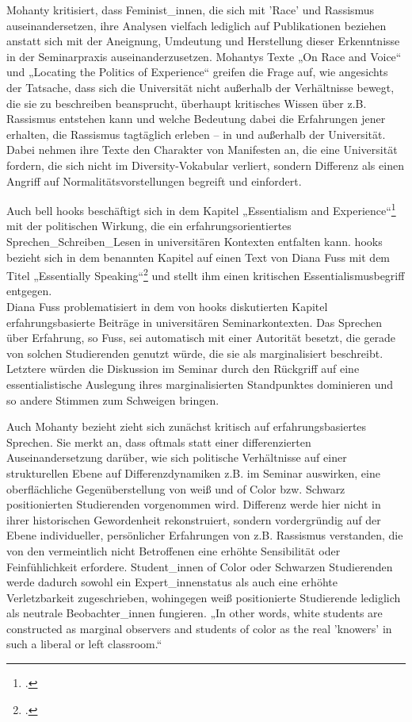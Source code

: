 Mohanty kritisiert, dass Feminist\_innen, die sich mit 'Race' und Rassismus
auseinandersetzen, ihre Analysen vielfach lediglich auf Publikationen beziehen
anstatt sich mit der Aneignung, Umdeutung und Herstellung dieser Erkenntnisse
in der Seminarpraxis auseinanderzusetzen. Mohantys Texte „On Race and
Voice“\footnotemark {} und
„Locating the Politics of Experience“\footnotemark{} greifen
die Frage auf, wie angesichts der Tatsache, dass sich die Universität nicht
außerhalb der Verhältnisse bewegt, die sie zu beschreiben beansprucht,
überhaupt kritisches Wissen über z.B. Rassismus entstehen kann und welche
Bedeutung dabei die Erfahrungen jener erhalten, die Rassismus tagtäglich
erleben – in und außerhalb der Universität. Dabei nehmen ihre Texte den
Charakter von Manifesten an, die eine Universität fordern, die sich nicht im
Diversity-Vokabular verliert, sondern Differenz als einen Angriff auf
Normalitätsvorstellungen begreift und einfordert.

Auch bell hooks beschäftigt sich in dem Kapitel „Essentialism and
Experience“\footnotemark\footcitetext{bellhooks}
mit der politischen Wirkung, die ein erfahrungsorientiertes
Sprechen\_Schreiben\_Lesen in universitären Kontexten entfalten kann. hooks
bezieht sich in dem benannten Kapitel auf einen Text von Diana Fuss mit dem
Titel „Essentially Speaking“\footnotemark\footcitetext[77]{bellhooks} und stellt ihm einen kritischen
Essentialismusbegriff entgegen.
\\

Diana Fuss problematisiert in dem von hooks diskutierten Kapitel
erfahrungsbasierte Beiträge in universitären Seminarkontexten. Das Sprechen
über Erfahrung, so Fuss, sei automatisch mit einer Autorität besetzt, die
gerade von solchen Studierenden genutzt würde, die sie als marginalisiert
beschreibt. Letztere würden die Diskussion im Seminar durch den Rückgriff auf
eine essentialistische Auslegung ihres marginalisierten Standpunktes dominieren
und so andere Stimmen zum Schweigen bringen.\footnotemark{}

Auch Mohanty bezieht zieht sich zunächst kritisch auf erfahrungsbasiertes
Sprechen. Sie merkt an, dass oftmals statt einer differenzierten
Auseinandersetzung darüber, wie sich politische Verhältnisse auf einer
strukturellen Ebene auf Differenzdynamiken z.B. im Seminar auswirken, eine
oberflächliche Gegenüberstellung von weiß und of Color bzw. Schwarz
positionierten Studierenden vorgenommen wird. Differenz werde hier nicht in
ihrer historischen Gewordenheit rekonstruiert, sondern vordergründig auf der
Ebene individueller, persönlicher Erfahrungen von z.B. Rassismus verstanden,
die von den vermeintlich nicht Betroffenen eine erhöhte Sensibilität oder
Feinfühlichkeit erfordere. Student\_innen of Color oder Schwarzen Studierenden
werde dadurch sowohl ein Expert\_innenstatus als auch eine erhöhte
Verletzbarkeit zugeschrieben, wohingegen weiß positionierte Studierende
lediglich als neutrale Beobachter\_innen fungieren. „In other words, white
students are constructed as marginal observers and students of color as the
real 'knowers' in such a liberal or left
classroom.“\footnotemark{}

